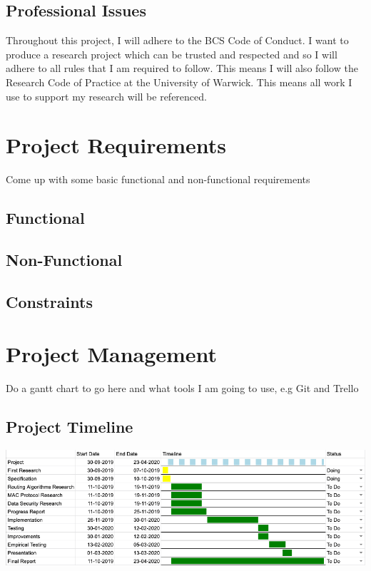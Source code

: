 \documentclass{report}
\begin{document}
\section*{Professional Issues}

Throughout this project, I will adhere to the BCS Code of Conduct\cite{BCSCoP}. I want to produce a 
research project which can be trusted and respected and so I will adhere to all rules that I am required 
to follow. This means I will also follow the Research Code of Practice at the University of Warwick\cite{UniWarwickCOP}. 
This means all work I use to support my research will be referenced. 

\chapter*{Project Requirements}

Come up with some basic functional and non-functional requirements

\section*{Functional}

\section*{Non-Functional}

\section*{Constraints}

\chapter*{Project Management}

Do a gantt chart to go here and what tools I am going to use, e.g Git and Trello
\section*{Project Timeline}

\includegraphics[scale=0.35]{ProjectTimeline}
\end{document}
